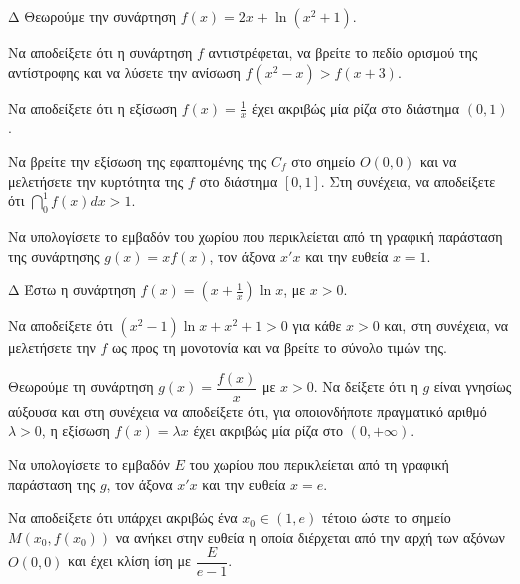 \begin{thema}{Δ}
Θεωρούμε την συνάρτηση $f(x) = 2x + \ln(x^2+1)$.
\begin{erwthma}
    \item Να αποδείξετε ότι η συνάρτηση $f$ αντιστρέφεται, να βρείτε το πεδίο ορισμού της αντίστροφης και να λύσετε την ανίσωση $f(x^2-x) > f(x+3)$.
    \item Να αποδείξετε ότι η εξίσωση $\displaystyle f(x) = \frac{1}{x}$ έχει ακριβώς μία ρίζα στο διάστημα $(0, 1)$.
    \item Να βρείτε την εξίσωση της εφαπτομένης της $C_f$ στο σημείο $O(0,0)$ και να μελετήσετε την κυρτότητα της $f$ στο διάστημα $[0, 1]$. Στη συνέχεια, να αποδείξετε ότι $\displaystyle \dint_0^1 f(x) dx > 1$.
    \item Να υπολογίσετε το εμβαδόν του χωρίου που περικλείεται από τη γραφική παράσταση της συνάρτησης $g(x) = x f(x)$, τον άξονα $x'x$ και την ευθεία $x=1$.
\end{erwthma}
\end{thema}

\begin{thema}{Δ}
Έστω η συνάρτηση $f(x) = \left(x + \frac{1}{x}\right) \ln x$, με $x > 0$.
\begin{erwthma}
    \item Να αποδείξετε ότι $(x^2 - 1)\ln x + x^2 + 1 > 0$ για κάθε $x>0$ και, στη συνέχεια, να μελετήσετε την $f$ ως προς τη μονοτονία και να βρείτε το σύνολο τιμών της.
    \item Θεωρούμε τη συνάρτηση $g(x) = \dfrac{f(x)}{x}$ με $x > 0$. Να δείξετε ότι η $g$ είναι γνησίως αύξουσα και στη συνέχεια να αποδείξετε ότι, για οποιονδήποτε πραγματικό αριθμό $\lambda > 0$, η εξίσωση $f(x) = \lambda x$ έχει ακριβώς μία ρίζα στο $(0, +\infty)$.
    \item Να υπολογίσετε το εμβαδόν $E$ του χωρίου που περικλείεται από τη γραφική παράσταση της $g$, τον άξονα $x'x$ και την ευθεία $x=e$.
    \item Να αποδείξετε ότι υπάρχει ακριβώς ένα $x_0 \in (1, e)$ τέτοιο ώστε το σημείο $M(x_0, f(x_0))$ να ανήκει στην ευθεία η οποία διέρχεται από την αρχή των αξόνων $O(0,0)$ και έχει κλίση ίση με $\dfrac{E}{e-1}$.
\end{erwthma}
\end{thema}

